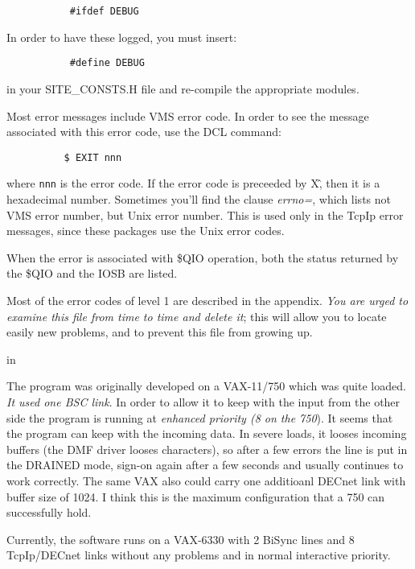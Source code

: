 {\tt ~~~~~~~~~~~\#ifdef DEBUG}

In order to have these logged, you must insert:

{\tt ~~~~~~~~~~~\#define DEBUG}

in your {\ncrBold SITE\_CONSTS.H} file and re-compile the appropriate modules.

Most error messages include VMS error  code.  In  order  to  see  the
message associated with this error code, use the DCL command:

{\tt ~~~~~~~~~~\$ EXIT nnn}

where {\tt nnn} is the error code. If the error code is preceeded by X\^, then
it is a hexadecimal number. Sometimes you'll  find  the  clause {\sl errno=},
which  lists  not  VMS error number, but Unix error number. This is used
only in the TcpIp error messages, since  these  packages  use  the  Unix
error codes.

When  the  error  is  associated with \$QIO operation, both the status
returned by the \$QIO and the IOSB are listed.

Most of the error codes of level 1 are described in the appendix. {\sl You
are  urged  to  examine  this file from time to time and delete it}; this
will allow you to locate easily new problems, and to prevent  this  file
from growing up.

 in

The  program was originally developed on a VAX-11/750 which was quite
loaded. {\sl It used one BSC link}. In order to allow  it  to  keep  with  the
input from the other side the program is running at {\sl enhanced priority (8
on the 750}). It seems that the program can keep with the  incoming  data.
In  severe  loads,  it  looses  incoming  buffers (the DMF driver looses
characters), so after a few errors the line is put in the DRAINED  mode,
sign-on  again  after  a  few  seconds  and  usually  continues  to work
correctly. The same VAX also could carry one additioanl DECnet link with
buffer  size  of  1024. I think this is the maximum configuration that a
750 can successfully hold.

Currently, the software runs on a VAX-6330 with 2 BiSync lines and 8
TcpIp/DECnet links without any problems and in normal interactive priority.

\vfill\eject


